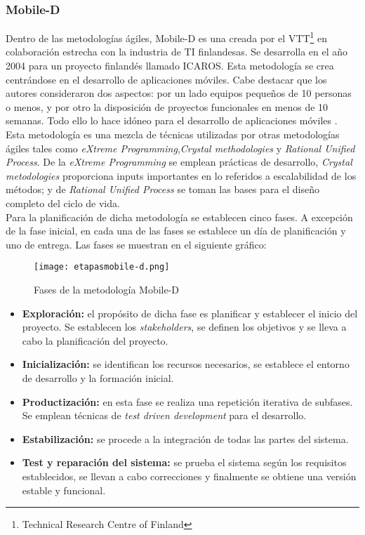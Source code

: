 \subsubsection*{Mobile-D}
Dentro de las metodologías ágiles, Mobile-D es una creada por el VTT\footnote{Technical Research Centre of Finland} en colaboración estrecha con la industria de TI finlandesas. Se desarrolla en el año 2004 para un proyecto finlandés llamado ICAROS. Esta metodología se crea centrándose en el desarrollo de aplicaciones móviles. Cabe destacar que los autores consideraron dos aspectos: por un lado equipos pequeños de 10 personas o menos, y por otro la disposición de proyectos funcionales en menos de 10 semanas. Todo ello lo hace idóneo para el desarrollo de aplicaciones móviles \cite{metodologidesarrollo2009}. \\
Esta metodología es una mezcla de técnicas utilizadas por otras metodologías ágiles tales como \textit{eXtreme Programming},\textit{Crystal methodologies} y \textit{Rational Unified Process}. De la \textit{eXtreme Programming} se emplean prácticas de desarrollo, \textit{Crystal metodologies} proporciona inputs importantes en lo referidos a escalabilidad de los métodos; y de \textit{Rational Unified Process} se toman las bases para el diseño completo del ciclo de vida. \\
Para la planificación de dicha metodología se establecen cinco fases. A excepción de la fase inicial, en cada una de las fases se establece un día de planificación y uno de entrega. Las fases \cite{AgileMobileD} se muestran en el siguiente gráfico:
\begin{figure}[H]
\centering
    \texttt{[image: etapasmobile-d.png]}
    \caption{Fases de la metodología Mobile-D}
\end{figure}
\begin{itemize}
    \item \textbf{Exploración: }el propósito de dicha fase es planificar y establecer el inicio del proyecto. Se establecen los \textit{stakeholders}, se definen los objetivos y se lleva a cabo la planificación del proyecto.
    \item \textbf{Inicialización: }se identifican los recursos necesarios, se establece el entorno de desarrollo y la formación inicial.
    \item \textbf{Productización: }en esta fase se realiza una repetición iterativa de subfases. Se emplean técnicas de \textit{test driven development} para el desarrollo.
    \item \textbf{Estabilización: }se procede a la integración de todas las partes del sistema.
    \item \textbf{Test y reparación del sistema: }se prueba el sistema según los requisitos establecidos, se llevan a cabo correcciones y finalmente se obtiene una versión estable y funcional.
\end{itemize}